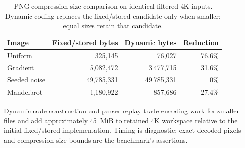 \begin{table}[!htbp]
\centering
\small
\caption[PNG compression size comparison]{PNG compression size comparison
on identical filtered 4K inputs. Dynamic coding replaces the fixed/stored
candidate only when smaller; equal sizes retain that candidate.}
\label{tab:png-compression-sizes}
\begin{tabularx}{\textwidth}{Xrrr}
\hline
Image & Fixed/stored bytes & Dynamic bytes & Reduction \\
\hline
Uniform      & 325,145    & 76,027     & 76.6\% \\
Gradient     & 5,082,472  & 3,477,715  & 31.6\% \\
Seeded noise & 49,785,331 & 49,785,331 & 0\% \\
Mandelbrot   & 1,180,922  & 857,686    & 27.4\% \\
\hline
\end{tabularx}
\end{table}

Dynamic code construction and parser replay trade encoding work for
smaller files and add approximately 45~MiB to retained 4K workspace
relative to the initial fixed/stored implementation. Timing is
diagnostic; exact decoded pixels and compression-size bounds are the
benchmark's assertions.
